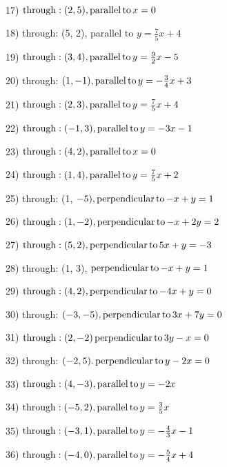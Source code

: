 \

{}

17) $\operatorname{through} : (2, 5), \operatorname{parallel} \operatorname{to} x = 0$

18) through: (5, 2), parallel to $y = \frac{7}{5} x + 4$

19) $\operatorname{through} : (3, 4), \operatorname{parallel} \operatorname{to} y = \frac{9}{2} x - 5$

20) through: $(1, - 1), \operatorname{parallel} \operatorname{to} y = - \frac{3}{4} x + 3$

21) $\operatorname{through} : (2, 3), \operatorname{parallel} \operatorname{to} y = \frac{7}{5} x + 4$

22) $\operatorname{through} : (- 1, 3), \operatorname{parallel} \operatorname{to} y = - 3 x - 1$

23) $\operatorname{through} : (4, 2), \operatorname{parallel} \operatorname{to} x = 0$

24) $\operatorname{through} : (1, 4), \operatorname{parallel} \operatorname{to} y = \frac{7}{5} x + 2$

25) through: (1, $- 5), \operatorname{perpendicular} \operatorname{to} - x + y = 1$

26) $\operatorname{through} : (1, - 2), \operatorname{perpendicular} \operatorname{to} - x + 2 y = 2$

27) $\operatorname{through} : (5, 2), \operatorname{perpendicular} \operatorname{to} 5 x + y = - 3$

28) through: (1, 3), $\operatorname{perpendicular} \operatorname{to} - x + y = 1$

29) $\operatorname{through} : (4, 2), \operatorname{perpendicular} \operatorname{to} - 4 x + y = 0$

30) through: $(- 3, - 5), \operatorname{perpendicular} \operatorname{to} 3 x + 7 y = 0$

31) $\operatorname{through} : (2, - 2) \operatorname{perpendicular} \operatorname{to} 3 y - x = 0$

32) through: $(- 2, 5) . \operatorname{perpendicular} \operatorname{to} y - 2 x = 0$

\pagebreak

{}

33) $\operatorname{through} : (4, - 3), \operatorname{parallel} \operatorname{to} y = - 2 x$

34) $\operatorname{through} : (- 5, 2), \operatorname{parallel} \operatorname{to} y = \frac{3}{5} x$

35) $\operatorname{through} : (- 3, 1), \operatorname{parallel} \operatorname{to} y = - \frac{4}{3} x
- 1$

36) $\operatorname{through} : (- 4, 0), \operatorname{parallel} \operatorname{to} y = - \frac{5}{4} x
+ 4$

